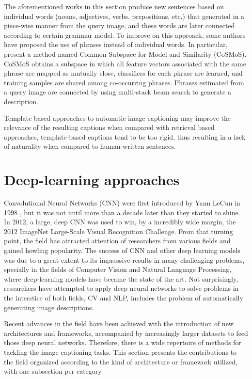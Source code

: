 The aforementioned works in this section produce new sentences based on individual words (nouns, adjectives, verbs, prepositions, etc.) that generated in a piece-wise manner from the query image, and these words are later connected according to certain grammar model. To improve on this approach, some authors have proposed the use of phrases instead of individual words. In particular, \citet{Ushiku2015} present a method named Common Subspace for Model and Similarity (CoSMoS). CoSMoS obtains a subspace in which all feature vectors associated with the same phrase are mapped as mutually close, classifiers for each phrase are learned, and training samples are shared among co-occurring phrases. Phrases estimated from a query image are connected by using multi-stack beam search to generate a description.

Template-based approaches to automatic image captioning may improve the relevance of the resulting captions when compared with retrieval based approaches, template-based captions tend to be too rigid, thus resulting in a lack of naturality when compared to human-written sentences.

\section{Deep-learning approaches}

Convolutional Neural Networks (CNN) were first introduced by Yann LeCun in 1998 \citep{Lecun1998}, but it was not until more than a decade later than they started to shine. In 2012, a large, deep CNN \citep{Krizhevsky2012} was used to win, by a incredibly wide margin, the 2012 ImageNet Large-Scale Visual Recognition Challenge. From that turning point, the field has attracted attention of researchers from various fields and gained howling popularity. The success of CNN and other deep learning models was due to a great extent to its impressive results in many challenging problems, specially in the fields of Computer Vision and Natural Language Processing, where deep-learning models have became the state of the art. Not surprisingly, researchers have attempted to apply deep neural networks to solve problems in the interstice of both fields, CV and NLP, includes the problem of automatically generating image descriptions.

Recent advances in the field have been achieved with the introduction of new architectures and frameworks, accompanied by increasingly larger datasets to feed those deep neural networks. Therefore, there is a wide repertoire of methods for tackling the image captioning tasks. This section presents the contributions to the field organized according to the kind of architecture or framework utilized, with one subsection per category

